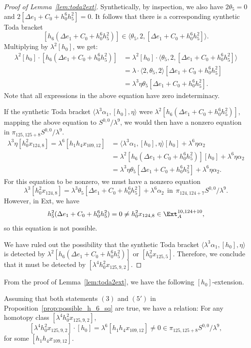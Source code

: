 \documentclass{amsart}
\numberwithin{equation}{section}
\begin{document}
\begin{proof}[Proof of Lemma~\ref{lem:toda2ext}]
Synthetically, by inspection, we also have $2\theta_5=0$ and $2 [\Delta e_1 +C_0+h_0^6h_5^2] = 0$. It follows that there is a corresponding synthetic Toda bracket
$$[h_6(\Delta e_1 +C_0+h_0^6h_5^2)] \in \langle \theta_5, 2, [\Delta e_1 +C_0+h_0^6h_5^2] \rangle.$$
Multiplying by $\lambda^2 [h_0]$, we get:
\begin{align*}
    \lambda^2 [h_0] \cdot [h_6(\Delta e_1 +C_0+h_0^6h_5^2)]& = \lambda^2 [h_0] \cdot \langle \theta_5, 2, [\Delta e_1 +C_0+h_0^6h_5^2] \rangle \\
    & = \lambda \cdot \langle 2, \theta_5, 2 \rangle [\Delta e_1 +C_0+h_0^6h_5^2]\\
    & = \lambda^3 \eta \theta_5 [\Delta e_1 +C_0+h_0^6h_5^2].
\end{align*}
Note that all expressions in the above equation have zero indeterminacy. 

If the synthetic Toda bracket $\langle \lambda^3 \alpha_1, [h_0], \eta \rangle$ were $\lambda^2 [h_6(\Delta e_1 +C_0+h_0^6h_5^2)]$, mapping the above equation to $S^{0,0}/\lambda^9$, we would then have a nonzero equation in $\pi_{125,125+8} S^{0,0}/\lambda^9$.
\begin{align*}
    \lambda^3 \eta [h_0^2 x_{124,8}] = \lambda^6 [h_1h_4x_{109,12}] & = \langle \lambda^3 \alpha_1, [h_0], \eta \rangle [h_0] + \lambda^6 \eta \alpha_2 \\ & = \lambda^2 [h_6(\Delta e_1 +C_0+h_0^6h_5^2)] [h_0] + \lambda^6 \eta \alpha_2\\ & = \lambda^3 \eta \theta_5 [\Delta e_1 +C_0+h_0^6h_5^2] + \lambda^6 \eta \alpha_2.
\end{align*}
For this equation to be nonzero, we must have a nonzero equation
$$\lambda^3 [h_0^2 x_{124,8}] = \lambda^3 \theta_5 [\Delta e_1 +C_0+h_0^6h_5^2] + \lambda^6 \alpha_2 \ \ \text{in} \ \ \pi_{124,124+7} S^{0,0}/\lambda^9.$$
However, in Ext, we have 
$$h_5^2 (\Delta e_1 +C_0+h_0^6h_5^2) = 0 \neq h_0^2 x_{124,8} \in \Ext_A^{10,124+10},$$
so this equation is not possible.


We have ruled out the possibility that the synthetic Toda bracket $\langle \lambda^3 \alpha_1, [h_0], \eta \rangle$ is detected by $\lambda^2 [h_6(\Delta e_1 +C_0+h_0^6h_5^2)]$ or $[h_0^2 x_{125,5}]$. Therefore, we conclude that it must be detected by $[\lambda^4 h_0^2 x_{125,9,2}]$.
\end{proof}

From the proof of Lemma~\ref{lem:toda2ext}, we have the following $[h_0]$-extension.

\begin{corollary} \label{cor:2ext125}
    Assuming that both statements $(3)$ and $(5')$ in Proposition~\ref{prop:possible_h_6_sq} are true, we have a relation: For any homotopy class $[\lambda^4 h_0^2x_{125,9,2}]$,
    $$[\lambda^4 h_0^2x_{125,9,2}] \cdot [h_0] = \lambda^6 [h_1h_4x_{109,12}] \neq 0 \in \pi_{125,125+8} S^{0,0}/\lambda^9,$$
    for some $[h_1h_4x_{109,12}]$.
\end{corollary}
\end{document}
